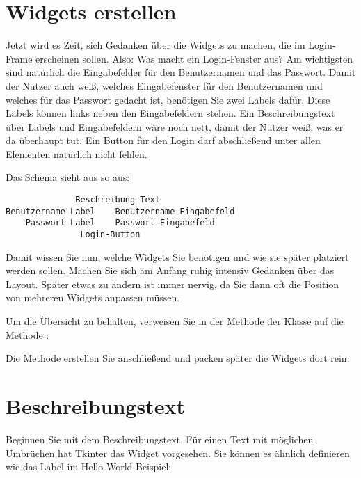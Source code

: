 \section{Widgets erstellen}

Jetzt wird es Zeit, sich Gedanken über die Widgets zu machen, die im Login-Frame erscheinen sollen. Also: Was macht ein Login-Fenster aus? Am wichtigsten sind natürlich die Eingabefelder für den Benutzernamen und das Passwort. Damit der Nutzer auch weiß, welches Eingabefenster für den Benutzernamen und welches für das Passwort gedacht ist, benötigen Sie zwei Labels dafür. Diese Labels können links neben den Eingabefeldern stehen. Ein Beschreibungstext über Labels und Eingabefeldern wäre noch nett, damit der Nutzer weiß, was er da überhaupt tut. Ein Button für den Login darf abschließend unter allen Elementen natürlich nicht fehlen.

Das Schema sieht aus so aus:

\begin{lstlisting}
              Beschreibung-Text
Benutzername-Label    Benutzername-Eingabefeld
    Passwort-Label    Passwort-Eingabefeld
               Login-Button
\end{lstlisting}

\medskip

Damit wissen Sie nun, welche Widgets Sie benötigen und wie sie später platziert werden sollen. Machen Sie sich am Anfang ruhig intensiv Gedanken über das Layout. Später etwas zu ändern ist immer nervig, da Sie dann oft die Position von mehreren Widgets anpassen müssen.

Um die Übersicht zu behalten, verweisen Sie in der Methode  der Klasse  auf die Methode :

\medskip


\medskip

Die Methode erstellen Sie anschließend und packen später die Widgets dort rein:
\medskip



\section{Beschreibungstext}


Beginnen Sie mit dem Beschreibungstext. Für einen Text mit möglichen Umbrüchen hat Tkinter das Widget  vorgesehen. Sie können es ähnlich definieren wie das Label im Hello-World-Beispiel:

